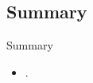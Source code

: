 \subsection{Summary}
\makesubcontentsslidessec


\begin{frame}
  \begin{block}{Summary}
    \begin{itemize}
      \item .
    \end{itemize}
  \end{block}
\end{frame}